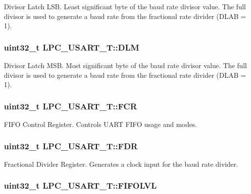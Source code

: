 Divisor Latch L\-S\-B. Least significant byte of the baud rate divisor value. The full divisor is used to generate a baud rate from the fractional rate divider (D\-L\-A\-B = 1). \hypertarget{structLPC__USART__T_a3e9b4b467fbbf43e57e261fd826e5e97}{
\subsubsection[{D\-L\-M}]{ uint32\-\_\-t L\-P\-C\-\_\-\-U\-S\-A\-R\-T\-\_\-\-T\-::\-D\-L\-M}}\label{structLPC__USART__T_a3e9b4b467fbbf43e57e261fd826e5e97}
Divisor Latch M\-S\-B. Most significant byte of the baud rate divisor value. The full divisor is used to generate a baud rate from the fractional rate divider (D\-L\-A\-B = 1). \hypertarget{structLPC__USART__T_a01d439a681b9a7a486ad75c91a2f91c8}{
\subsubsection[{F\-C\-R}]{ uint32\-\_\-t L\-P\-C\-\_\-\-U\-S\-A\-R\-T\-\_\-\-T\-::\-F\-C\-R}}\label{structLPC__USART__T_a01d439a681b9a7a486ad75c91a2f91c8}
F\-I\-F\-O Control Register. Controls U\-A\-R\-T F\-I\-F\-O usage and modes. \hypertarget{structLPC__USART__T_ae35ac03aeeafd5a54f2c2c675b6dca4f}{
\subsubsection[{F\-D\-R}]{ uint32\-\_\-t L\-P\-C\-\_\-\-U\-S\-A\-R\-T\-\_\-\-T\-::\-F\-D\-R}}\label{structLPC__USART__T_ae35ac03aeeafd5a54f2c2c675b6dca4f}
Fractional Divider Register. Generates a clock input for the baud rate divider. \hypertarget{structLPC__USART__T_a1e5a80261f84a375eda3b575bea8074a}{
\subsubsection[{F\-I\-F\-O\-L\-V\-L}]{ uint32\-\_\-t L\-P\-C\-\_\-\-U\-S\-A\-R\-T\-\_\-\-T\-::\-F\-I\-F\-O\-L\-V\-L}}\label{structLPC__USART__T_a1e5a80261f84a375eda3b575bea8074a}
